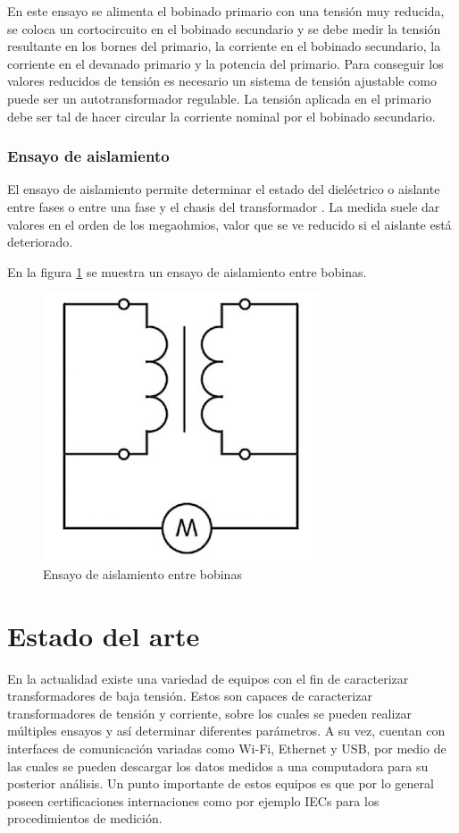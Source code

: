En este ensayo se alimenta el bobinado primario con una tensión muy reducida, se coloca un cortocircuito en el bobinado secundario y se debe medir la tensión resultante en los bornes del primario, la corriente en el bobinado secundario, la corriente en el devanado primario y la potencia del primario. Para conseguir los valores reducidos de tensión es necesario un sistema de tensión ajustable como puede ser un autotransformador regulable. La tensión aplicada en el primario debe ser tal de hacer circular la corriente nominal por el bobinado secundario.

\subsubsection{Ensayo de aislamiento}

El ensayo de aislamiento permite determinar el estado del dieléctrico o aislante entre fases o entre una fase y el chasis del transformador \citep{TRAFO_AISL}. La medida suele dar valores en el orden de los megaohmios, valor que se ve reducido si el aislante está deteriorado.

En la figura \ref{fig:figEnsayoAislacion} se muestra un ensayo de aislamiento entre bobinas.

\begin{figure}[htpb]
	\centering
	\includegraphics[scale=.5]{./Figures/EnsayoAislacion.png}
	\caption{Ensayo de aislamiento entre bobinas}
	\label{fig:figEnsayoAislacion}
\end{figure}



\section{Estado del arte}
En la actualidad existe una variedad de equipos con el fin de caracterizar transformadores de baja tensión. Estos son capaces de caracterizar transformadores de tensión y corriente, sobre los cuales se pueden realizar múltiples ensayos y así determinar diferentes parámetros. A su vez, cuentan con interfaces de comunicación variadas como Wi-Fi, Ethernet y USB, por medio de las cuales se pueden descargar los datos medidos a una computadora para su posterior análisis. Un punto importante de estos equipos es que por lo general poseen certificaciones internaciones como por ejemplo IECs para los procedimientos de medición.

